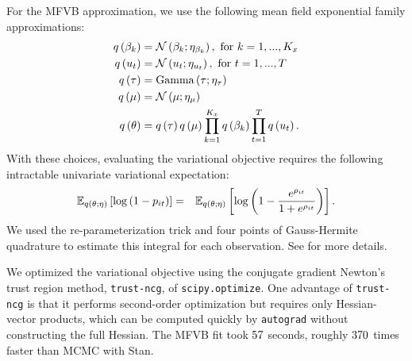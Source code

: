 \documentclass{article}\usepackage[]{graphicx}\usepackage[]{color}
\theoremstyle{definition}
\theoremstyle{plain}
\theoremstyle{plain}
\theoremstyle{plain}
\theoremstyle{definition}
\theoremstyle{plain}
\theoremstyle{plain}
\begin{document}
For the MFVB approximation, we use the following mean field exponential
family approximations:
\begin{align*}
q\left(\beta_{k}\right) & =\mathcal{N}\left(\beta_{k};\eta_{\beta_{k}}\right),\textrm{ for }k=1,...,K_{x}\\
q\left(u_{t}\right) & =\mathcal{N}\left(u_{t};\eta_{u_{t}}\right),\textrm{ for }t=1,...,T\\
q\left(\tau\right) & =\textrm{Gamma}\left(\tau;\eta_{\tau}\right)\\
q\left(\mu\right) & =\mathcal{N}\left(\mu;\eta_{\mu}\right)\\
q\left(\theta\right) & =
    q\left(\tau\right)q\left(\mu\right)
    \prod_{k=1}^{K_{x}}q\left(\beta_{k}\right)\prod_{t=1}^{T}q\left(u_{t}\right).
\end{align*}
With these choices, evaluating the variational objective requires
the following intractable univariate variational expectation:
\begin{eqnarray*}
\mathbb{E}_{q\left(\theta;\eta\right)}\left[\log\left(1-p_{it}\right)\right] & = &
    \mathbb{E}_{q\left(\theta;\eta\right)}\left[\log\left(1
        -\frac{e^{\rho_{it}}}{1+e^{\rho_{it}}}\right)\right].
\end{eqnarray*}
We used the re-parameterization trick and four points of Gauss-Hermite
quadrature to estimate this integral for each observation. See
 for more details.

We optimized the variational objective using the conjugate gradient
Newton's trust region method, \texttt{trust-ncg}, of \texttt{scipy.optimize}.
One advantage of \texttt{trust-ncg} is that it performs second-order
optimization but requires only Hessian-vector products, which can
be computed quickly by \texttt{autograd} without constructing the
full Hessian. The MFVB fit took $57$ seconds, roughly $370$
times faster than MCMC with Stan.
\end{document}
